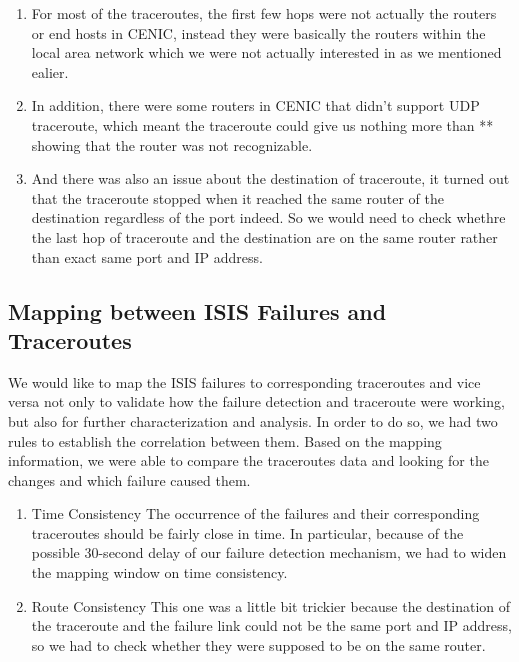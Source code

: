 \documentclass[conference, twocolumn, oneside, 10pt]{IEEEtran}
\begin{document}
\begin{enumerate}

\item{} For most of the traceroutes, the first few hops were not actually the routers or end hosts in CENIC, instead they were basically the routers within the local area network which we were not actually interested in as we mentioned ealier.

\item{} In addition, there were some routers in CENIC that didn't support UDP traceroute, which meant the traceroute could give us nothing more than ** showing that the router was not recognizable.

\item{} And there was also an issue about the destination of traceroute, it turned out that the traceroute stopped when it reached the same router of the destination regardless of the port indeed. So we would need to check whethre the last hop of traceroute and the destination are on the same router rather than exact same port and IP address.

\end{enumerate}

\subsection{Mapping between ISIS Failures and Traceroutes}

We would like to map the ISIS failures to corresponding traceroutes and vice versa not only to validate how the failure detection and traceroute were working, but also for further characterization and analysis. In order to do so, we had two rules to establish the correlation between them. Based on the mapping information, we were able to compare the traceroutes data and looking for the changes and which failure caused them.

\begin{enumerate}

\item{Time Consistency} The occurrence of the failures and their corresponding traceroutes should be fairly close in time. In particular, because of the possible 30-second delay of our failure detection mechanism, we had to widen the mapping window on time consistency.

\item{Route Consistency} This one was a little bit trickier because the destination of the traceroute and the failure link could not be the same port and IP address, so we had to check whether they were supposed to be on the same router.

\end{enumerate}
\end{document}
